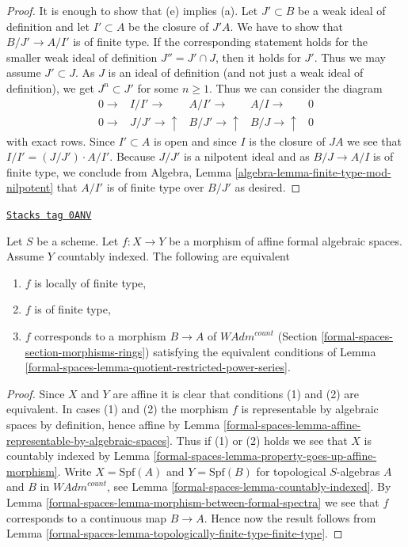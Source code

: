 \begin{proof}
It is enough to show that (e) implies (a). Let $J' \subset B$ be a weak ideal
of definition and let $I' \subset A$ be the closure of $J'A$. We have
to show that $B/J' \to A/I'$ is of finite type. If the corresponding statement
holds for the smaller weak ideal of definition $J'' = J' \cap J$, then it
holds for $J'$. Thus we may assume $J' \subset J$. As $J$ is an ideal
of definition (and not just a weak ideal of definition), we get
$J^n \subset J'$ for some $n \geq 1$. Thus we can consider the
diagram
$$
\begin{array}{ccccc}0 \longrightarrow & I/I' \longrightarrow & A/I' \longrightarrow & A/I \longrightarrow & 0 \\ 0 \longrightarrow & J/J' \longrightarrow\uparrow & B/J' \longrightarrow\uparrow & B/J \longrightarrow\uparrow & 0\end{array}
$$
with exact rows. Since $I' \subset A$ is open and since
$I$ is the closure of $J A$ we see that $I/I' = (J/J') \cdot A/I'$.
Because $J/J'$ is a nilpotent ideal and as $B/J \to A/I$ is of finite type,
we conclude from Algebra, Lemma \ref{algebra-lemma-finite-type-mod-nilpotent}
that $A/I'$ is of finite type over $B/J'$ as desired.
\end{proof}

\begin{lemma}
\label{formal-spaces-lemma-representable-affine-finite-type}
\href{https://stacks.math.columbia.edu/tag/0ANV}{\texttt{Stacks tag 0ANV}}

Let $S$ be a scheme. Let $f : X \to Y$ be a morphism of
affine formal algebraic spaces. Assume $Y$ countably indexed.
The following are equivalent
\begin{enumerate}
\item $f$ is locally of finite type,
\item $f$ is of finite type,
\item $f$ corresponds to a morphism $B \to A$ of $\textit{WAdm}^{count}$
(Section \ref{formal-spaces-section-morphisms-rings})
satisfying the equivalent conditions of
Lemma \ref{formal-spaces-lemma-quotient-restricted-power-series}.
\end{enumerate}
\end{lemma}

\begin{proof}
Since $X$ and $Y$ are affine it is clear that conditions (1)
and (2) are equivalent. In cases (1) and (2) the morphism $f$
is representable by algebraic spaces by definition, hence
affine by Lemma \ref{formal-spaces-lemma-affine-representable-by-algebraic-spaces}.
Thus if (1) or (2) holds we see that
$X$ is countably indexed by
Lemma \ref{formal-spaces-lemma-property-goes-up-affine-morphism}.
Write $X = \text{Spf}(A)$ and $Y = \text{Spf}(B)$
for topological $S$-algebras $A$ and $B$ in $\textit{WAdm}^{count}$, see
Lemma \ref{formal-spaces-lemma-countably-indexed}. By
Lemma \ref{formal-spaces-lemma-morphism-between-formal-spectra}
we see that $f$ corresponds to a continuous map $B \to A$.
Hence now the result follows from
Lemma \ref{formal-spaces-lemma-topologically-finite-type-finite-type}.
\end{proof}


